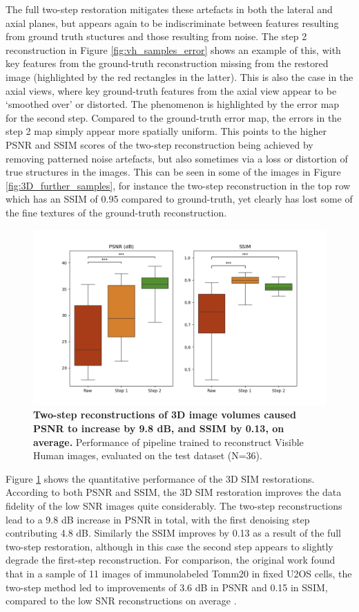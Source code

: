 \documentclass[12pt]{article}
\begin{document}
The full two-step restoration mitigates these artefacts in both the lateral and axial planes,
but appears again to be indiscriminate between features resulting from ground truth stuctures and those resulting from noise.
The step 2 reconstruction in Figure \ref{fig:vh_samples_error} shows an example of this,
with key features from the ground-truth reconstruction missing from the restored image (highlighted by the red rectangles in the latter).
This is also the case in the axial views, where key ground-truth features from the axial view appear to be `smoothed over' or distorted.
The phenomenon is highlighted by the error map for the second step.
Compared to the ground-truth error map, the errors in the step 2 map simply appear more spatially uniform.
This points to the higher PSNR and SSIM scores of the two-step reconstruction being achieved by removing patterned noise artefacts,
but also sometimes via a loss or distortion of true structures in the images.
This can be seen in some of the images in Figure \ref{fig:3D_further_samples},
for instance the two-step reconstruction in the top row which has an SSIM of 0.95 compared to ground-truth,
yet clearly has lost some of the fine textures of the ground-truth reconstruction.

\begin{figure}[htb]
    \includegraphics[scale=0.75, center]{figures/boxplot_3d.png}
    \caption{\textbf{Two-step reconstructions of 3D image volumes caused PSNR to increase by 9.8 dB, and SSIM by 0.13, on average.}
    Performance of pipeline trained to reconstruct Visible Human images, evaluated on the test dataset (N=36).}
    \label{fig:vh_stats}
\end{figure}

Figure \ref{fig:vh_stats} shows the quantitative performance of the 3D SIM restorations.
According to both PSNR and SSIM, the 3D SIM restoration improves the data fidelity of the low SNR images quite considerably.
The two-step reconstructions lead to a 9.8 dB increase in PSNR in total,
with the first denoising step contributing 4.8 dB.
Similarly the SSIM improves by 0.13 as a result of the full two-step restoration,
although in this case the second step appears to slightly degrade the first-step reconstruction.
For comparison, the original work found that in a sample of 11 images of immunolabeled Tomm20 in fixed U2OS cells,
the two-step method led to improvements of 3.6 dB in PSNR and 0.15 in SSIM, compared to the low SNR reconstructions on average \cite{keypaper}.
\end{document}
